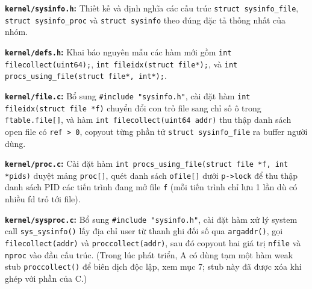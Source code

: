 \item \textbf{\texttt{kernel/sysinfo.h}:} Thiết kế và định nghĩa các cấu trúc \texttt{struct sysinfo\_file}, \texttt{struct sysinfo\_proc} và \texttt{struct sysinfo} theo đúng đặc tả thống nhất của nhóm.

\item \textbf{\texttt{kernel/defs.h}:} Khai báo nguyên mẫu các hàm mới gồm \texttt{int filecollect(uint64);}, \texttt{int fileidx(struct file*);}, và \texttt{int procs\_using\_file(struct file*, int*);}.

\item \textbf{\texttt{kernel/file.c}:} Bổ sung \texttt{\#include "sysinfo.h"}, cài đặt hàm \texttt{int fileidx(struct file *f)} chuyển đổi con trỏ file sang chỉ số ô trong \texttt{ftable.file[]}, và hàm \texttt{int filecollect(uint64 addr)} thu thập danh sách open file có \texttt{ref > 0}, copyout từng phần tử \texttt{struct sysinfo\_file} ra buffer người dùng.

\item \textbf{\texttt{kernel/proc.c}:} Cài đặt hàm \texttt{int procs\_using\_file(struct file *f, int *pids)} duyệt mảng \texttt{proc[]}, quét danh sách \texttt{ofile[]} dưới \texttt{p->lock} để thu thập danh sách PID các tiến trình đang mở file \texttt{f} (mỗi tiến trình chỉ lưu 1 lần dù có nhiều fd trỏ tới file).

\item \textbf{\texttt{kernel/sysproc.c}:} Bổ sung \texttt{\#include "sysinfo.h"}, cài đặt hàm xử lý system call \texttt{sys\_sysinfo()} lấy địa chỉ user từ thanh ghi đối số qua \texttt{argaddr()}, gọi \texttt{filecollect(addr)} và \texttt{proccollect(addr)}, sau đó copyout hai giá trị \texttt{nfile} và \texttt{nproc} vào đầu cấu trúc. (Trong lúc phát triển, A có dùng tạm một hàm weak stub \texttt{proccollect()} để biên dịch độc lập, xem mục 7; stub này đã được xóa khi ghép với phần của C.)

